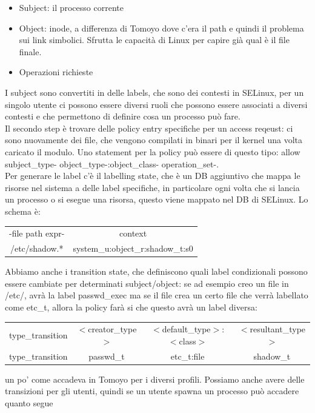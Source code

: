 \documentclass[12pt, oneside]{extbook} %
\begin{document}
\begin{itemize}
\item Subject: il processo corrente
\item Object: inode, a differenza di Tomoyo dove c'era il path e quindi il problema sui link simbolici. Sfrutta le capacità di Linux per capire già qual è il file finale.
\item Operazioni richieste
\end{itemize}
I subject sono convertiti in delle labels, che sono dei contesti in SELinux, per un singolo utente ci possono essere diversi ruoli che possono essere associati a diversi contesti e che permettono di definire cosa un processo può fare.\\Il secondo step è trovare delle policy entry specifiche per un access reqeust: ci sono nuovamente dei file, che vengono compilati in binari per il kernel una volta caricato il modulo. Uno statement per la policy può essere di questo tipo: allow \-subject\_type- \-object\_type-:\-object\_class- \-operation\_set-.\\Per generare le label c'è il labelling state, che è un DB aggiuntivo che mappa le risorse nel sistema a delle label specifiche, in particolare ogni volta che si lancia un processo o si esegue una risorsa, questo viene mappato nel DB di SELinux. Lo schema è:
\begin{tabular}{|c|c}
-file path expr- & context\\
/etc/shadow.* & system\_u:object\_r:shadow\_t:s0\\
\end{tabular}
Abbiamo anche i transition state, che definiscono quali label condizionali possono essere cambiate per determinati subject/object: se ad esempio creo un file in /etc/, avrà la label passwd\_exec ma se il file crea un certo file che verrà labellato come etc\_t, allora la policy farà si che questo avrà un label diversa:
\begin{table}[!h]
	\begin{tabular}{c c c c}
		type\_transition & $<$creator\_type$>$ & $<$default\_type$>$:$<$class$>$ & $<$resultant\_type$>$\\
		type\_transition & passwd\_t & etc\_t:file & shadow\_t\\
	\end{tabular}
\end{table}
un po' come accadeva in Tomoyo per i diversi profili. Possiamo anche avere delle transizioni per gli utenti, quindi se un utente spawna un processo può accadere quanto segue\\
\end{document}
